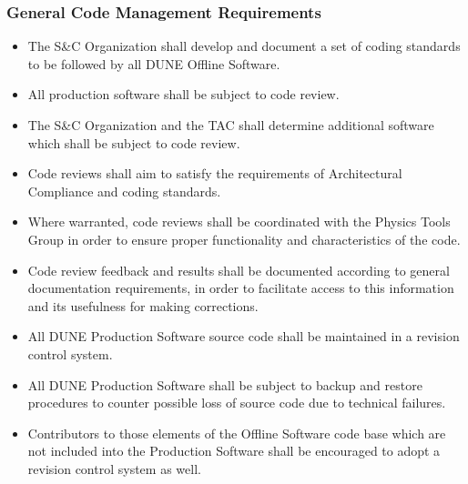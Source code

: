 \subsubsection{General Code Management Requirements}
\label{sec:lbnecodeman}
\begin{itemize}
\item The S\&C Organization shall develop and document a set of coding standards to be followed by all DUNE Offline Software.

\item All production software shall be subject to code review.


\item The S\&C Organization and the TAC shall determine additional software which shall be subject to code review.

\item Code reviews shall aim to satisfy the requirements of Architectural Compliance and coding standards.



\item Where warranted, code reviews shall be coordinated with the Physics Tools Group in order to ensure proper functionality and characteristics of the code.


\item Code review feedback and results shall be documented according to general documentation requirements, in order to facilitate access to this information and its usefulness for making corrections.

\item All DUNE Production Software source code shall be maintained in a revision control system.

\item All DUNE Production Software shall be subject to backup and restore procedures to counter possible loss of source code due to technical failures.

\item Contributors to those elements of the Offline Software code base which are not included into the Production Software shall be encouraged to adopt a revision control system as well.


\end{itemize}

